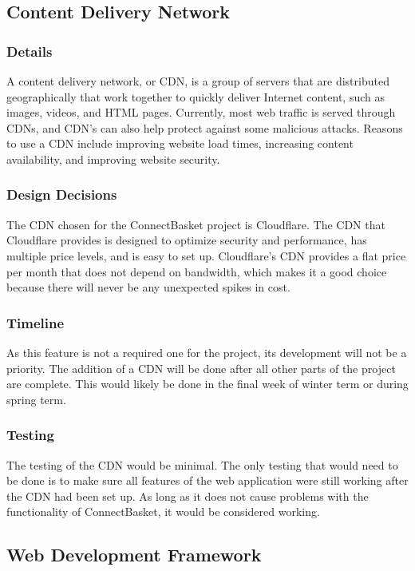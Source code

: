 \documentclass[onecolumn, draftclsnofoot,10pt, compsoc]{IEEEtran}
\begin{document}
\subsection{Content Delivery Network}

\subsubsection{Details}
A content delivery network, or CDN, is a group of servers that are distributed geographically that work together to quickly deliver Internet content, such as images, videos, and HTML pages. Currently, most web traffic is served through CDNs, and CDN's can also help protect against some malicious attacks. Reasons to use a CDN include improving website load times, increasing content availability, and improving website security.


\subsubsection{Design Decisions}
The CDN chosen for the ConnectBasket project is Cloudflare. The CDN that Cloudflare provides is designed to optimize security and performance, has multiple price levels, and is easy to set up. Cloudflare's CDN provides a flat price per month that does not depend on bandwidth, which makes it a good choice because there will never be any unexpected spikes in cost.


\subsubsection{Timeline}
As this feature is not a required one for the project, its development will not be a priority. The addition of a CDN will be done after all other parts of the project are complete. This would likely be done in the final week of winter term or during spring term.


\subsubsection{Testing}
The testing of the CDN would be minimal. The only testing that would need to be done is to make sure all features of the web application were still working after the CDN had been set up. As long as it does not cause problems with the functionality of ConnectBasket, it would be considered working.

\subsection{Web Development Framework}
\end{document}
